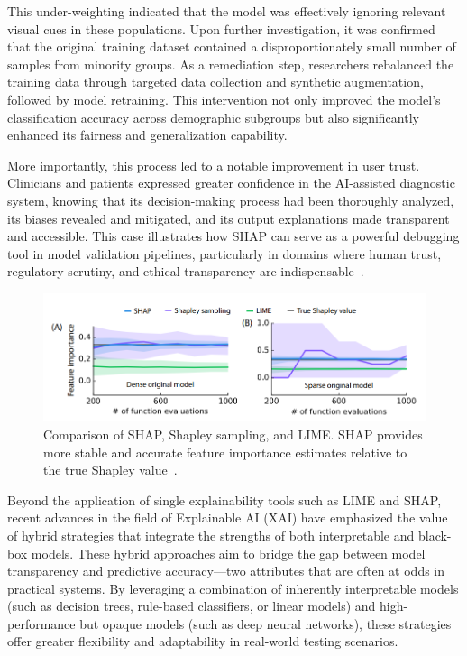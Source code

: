 \documentclass[manuscript,screen,review]{acmart}
\begin{document}
This under-weighting indicated that the model was effectively ignoring relevant visual cues in these populations. Upon further investigation, it was confirmed that the original training dataset contained a disproportionately small number of samples from minority groups. As a remediation step, researchers rebalanced the training data through targeted data collection and synthetic augmentation, followed by model retraining. This intervention not only improved the model’s classification accuracy across demographic subgroups but also significantly enhanced its fairness and generalization capability.

More importantly, this process led to a notable improvement in user trust. Clinicians and patients expressed greater confidence in the AI-assisted diagnostic system, knowing that its decision-making process had been thoroughly analyzed, its biases revealed and mitigated, and its output explanations made transparent and accessible. This case illustrates how SHAP can serve as a powerful debugging tool in model validation pipelines, particularly in domains where human trust, regulatory scrutiny, and ethical transparency are indispensable~\cite{Lundberg2017}.

\begin{figure}[htbp]
  \centering
  \includegraphics[width=0.85\linewidth]{picture/5.2fig2.png}
  \caption{Comparison of SHAP, Shapley sampling, and LIME. SHAP provides more stable and accurate feature importance estimates relative to the true Shapley value~\cite{Lundberg2017}.}
  \label{fig:shap}
\end{figure}

Beyond the application of single explainability tools such as LIME and SHAP, recent advances in the field of Explainable AI (XAI) have emphasized the value of hybrid strategies that integrate the strengths of both interpretable and black-box models. These hybrid approaches aim to bridge the gap between model transparency and predictive accuracy---two attributes that are often at odds in practical systems. By leveraging a combination of inherently interpretable models (such as decision trees, rule-based classifiers, or linear models) and high-performance but opaque models (such as deep neural networks), these strategies offer greater flexibility and adaptability in real-world testing scenarios.
\end{document}

